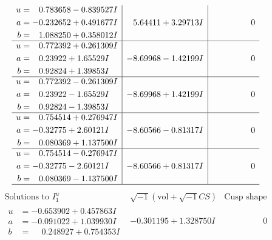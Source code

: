 \documentclass[1p]{elsarticle_modified}
\theoremstyle{definition}
\newcommand{\I}{\sqrt{-1}}
\begin{document}
$$\begin{array}{c|c|c}
\begin{aligned}
u &= \phantom{-}0.783658 - 0.839527 I \\
a &= -0.232652 + 0.491677 I \\
b &= \phantom{-}1.088250 + 0.358012 I\end{aligned}
 & \phantom{-}5.64411 + 3.29713 I & \phantom{-0.000000 } 0 \\ \hline\begin{aligned}
u &= \phantom{-}0.772392 + 0.261309 I \\
a &= \phantom{-}0.23922 + 1.65529 I \\
b &= \phantom{-}0.92824 + 1.39853 I\end{aligned}
 & -8.69968 - 1.42199 I & \phantom{-0.000000 } 0 \\ \hline\begin{aligned}
u &= \phantom{-}0.772392 - 0.261309 I \\
a &= \phantom{-}0.23922 - 1.65529 I \\
b &= \phantom{-}0.92824 - 1.39853 I\end{aligned}
 & -8.69968 + 1.42199 I & \phantom{-0.000000 } 0 \\ \hline\begin{aligned}
u &= \phantom{-}0.754514 + 0.276947 I \\
a &= -0.32775 + 2.60121 I \\
b &= \phantom{-}0.080369 + 1.137500 I\end{aligned}
 & -8.60566 - 0.81317 I & \phantom{-0.000000 } 0 \\ \hline\begin{aligned}
u &= \phantom{-}0.754514 - 0.276947 I \\
a &= -0.32775 - 2.60121 I \\
b &= \phantom{-}0.080369 - 1.137500 I\end{aligned}
 & -8.60566 + 0.81317 I & \phantom{-0.000000 } 0\\
 \hline 
 \end{array}$$\newpage$$\begin{array}{c|c|c}  
\text{Solutions to }I^u_{1}& \I (\text{vol} + \sqrt{-1}CS) & \text{Cusp shape}\\
 \hline 
\begin{aligned}
u &= -0.653902 + 0.457863 I \\
a &= -0.091022 + 1.039930 I \\
b &= \phantom{-}0.248927 + 0.754353 I\end{aligned}
 & -0.301195 + 1.328750 I & \phantom{-0.000000 } 0 \\ \hline\begin{aligned}

\end{aligned}
\end{array}$$
\end{document}
